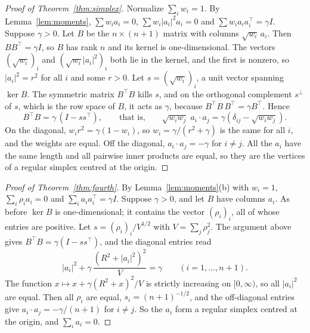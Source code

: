 \documentclass[11pt]{article}
\theoremstyle{remark}
\begin{document}
\begin{proof}[Proof of Theorem~\ref{thm:simplex}]
Normalize $\sum_iw_i=1$. By Lemma~\ref{lem:moments}, $\sum w_ia_i=0$, $\sum w_i|a_i|^2a_i=0$ and $\sum w_ia_ia_i^{\top}=\gamma I$. Suppose $\gamma>0$. Let $B$ be the $n\times(n+1)$ matrix with columns $\sqrt{w_i}\,a_i$. Then $BB^{\top}=\gamma I$, so $B$ has rank $n$ and its kernel is one-dimensional. The vectors $(\sqrt{w_i})_i$ and $(\sqrt{w_i}|a_i|^2)_i$ both lie in the kernel, and the first is nonzero, so $|a_i|^2=r^2$ for all $i$ and some $r>0$. Let $s=(\sqrt{w_i})_i$, a unit vector spanning $\ker B$. The symmetric matrix $B^{\top}B$ kills $s$, and on the orthogonal complement $s^{\perp}$ of $s$, which is the row space of $B$, it acts as $\gamma$, because $B^{\top}B\,B^{\top}=\gamma B^{\top}$. Hence
\[
B^{\top}B=\gamma\,(I-ss^{\top}),\qquad\text{that is,}\qquad \sqrt{w_iw_j}\;a_i\cdot a_j=\gamma(\delta_{ij}-\sqrt{w_iw_j}).
\]
On the diagonal, $w_ir^2=\gamma(1-w_i)$, so $w_i=\gamma/(r^2+\gamma)$ is the same for all $i$, and the weights are equal. Off the diagonal, $a_i\cdot a_j=-\gamma$ for $i\ne j$. All the $a_i$ have the same length and all pairwise inner products are equal, so they are the vertices of a regular simplex centred at the origin.
\end{proof}

\begin{proof}[Proof of Theorem~\ref{thm:fourth}]
By Lemma~\ref{lem:moments}(b) with $w_i=1$, $\sum_i\rho_ia_i=0$ and $\sum_ia_ia_i^{\top}=\gamma I$. Suppose $\gamma>0$, and let $B$ have columns $a_i$. As before $\ker B$ is one-dimensional; it contains the vector $(\rho_i)_i$, all of whose entries are positive. Let $s=(\rho_i)_i/V^{1/2}$ with $V=\sum_j\rho_j^2$. The argument above gives $B^{\top}B=\gamma(I-ss^{\top})$, and the diagonal entries read
\[
|a_i|^2+\gamma\,\frac{(R^2+|a_i|^2)^2}{V}=\gamma\qquad(i=1,\dots,n+1).
\]
The function $x\mapsto x+\gamma(R^2+x)^2/V$ is strictly increasing on $[0,\infty)$, so all $|a_i|^2$ are equal. Then all $\rho_i$ are equal, $s_i=(n+1)^{-1/2}$, and the off-diagonal entries give $a_i\cdot a_j=-\gamma/(n+1)$ for $i\ne j$. So the $a_i$ form a regular simplex centred at the origin, and $\sum_i a_i=0$.
\end{proof}
\end{document}
